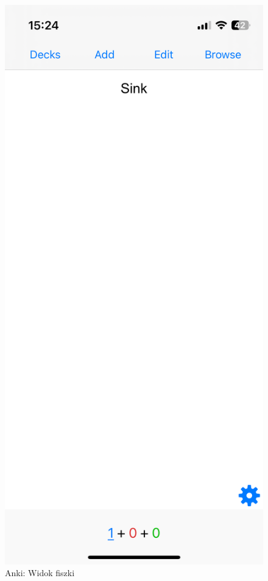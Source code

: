 \documentclass[final,a4paper,openany,12pt]{mwbk}
\begin{document}
\begin{figure}[H]
\centering
\begin{minipage}{0.5\textwidth}
  \centering
\includegraphics[width=.75\linewidth]{img/anki3.PNG}
  \caption{Anki: Widok fiszki}
  \label{fig:anki3}
\end{minipage}%
\begin{minipage}{0.5\textwidth}
  \centering

\end{minipage}
\end{figure}
\end{document}
